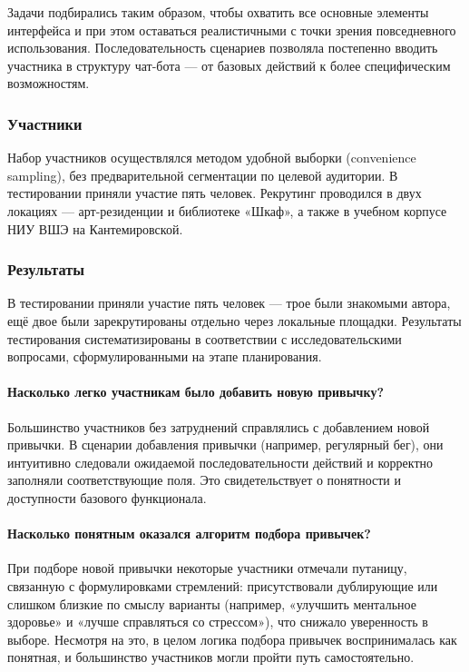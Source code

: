 \documentclass[pdflatex,sn-mathphys-num]{sn-jnl}%
\theoremstyle{thmstyleone}%
\theoremstyle{thmstyletwo}%
\theoremstyle{thmstylethree}%
\begin{document}
Задачи подбирались таким образом, чтобы охватить все основные элементы интерфейса и при этом оставаться реалистичными с точки зрения повседневного использования. Последовательность сценариев позволяла постепенно вводить участника в структуру чат-бота — от базовых действий к более специфическим возможностям.

\subsubsection{Участники}

Набор участников осуществлялся методом удобной выборки (convenience sampling), без предварительной сегментации по целевой аудитории. В тестировании приняли участие пять человек. Рекрутинг проводился в двух локациях — арт-резиденции и библиотеке «Шкаф», а также в учебном корпусе НИУ ВШЭ на Кантемировской.

\subsubsection{Результаты}

В тестировании приняли участие пять человек — трое были знакомыми автора, ещё двое были зарекрутированы отдельно через локальные площадки. Результаты тестирования систематизированы в соответствии с исследовательскими вопросами, сформулированными на этапе планирования.

\paragraph{Насколько легко участникам было добавить новую привычку?}

Большинство участников без затруднений справлялись с добавлением новой привычки. В сценарии добавления привычки (например, регулярный бег), они интуитивно следовали ожидаемой последовательности действий и корректно заполняли соответствующие поля. Это свидетельствует о понятности и доступности базового функционала.

\paragraph{Насколько понятным оказался алгоритм подбора привычек?}

При подборе новой привычки некоторые участники отмечали путаницу, связанную с формулировками стремлений: присутствовали дублирующие или слишком близкие по смыслу варианты (например, «улучшить ментальное здоровье» и «лучше справляться со стрессом»), что снижало уверенность в выборе. Несмотря на это, в целом логика подбора привычек воспринималась как понятная, и большинство участников могли пройти путь самостоятельно.
\end{document}
